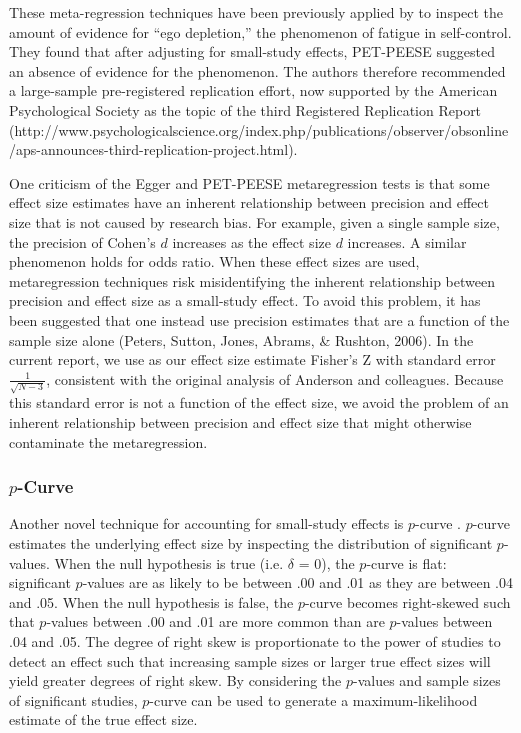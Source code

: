 \documentclass[man]{apa6}
\begin{document}
These meta-regression techniques have been previously applied by \citet{Carter:McCullough:2014} to inspect the amount of evidence for ``ego depletion,'' the phenomenon of fatigue in self-control. They found that after adjusting for small-study effects, PET-PEESE suggested an absence of evidence for the phenomenon. The authors therefore recommended a large-sample pre-registered replication effort, now supported by the American Psychological Society as the topic of the third Registered Replication Report (http://www.psychologicalscience.org/index.php/publications/observer/obsonline/aps-announces-third-replication-project.html).

One criticism of the Egger and PET-PEESE metaregression tests is that some effect size estimates have an inherent relationship between precision and effect size that is not caused by research bias. For example, given a single sample size, the precision of Cohen's $d$ increases as the effect size $d$ increases. A similar phenomenon holds for odds ratio. When these effect sizes are used, metaregression techniques risk misidentifying the inherent relationship between precision and effect size as a small-study effect. To avoid this problem, it has been suggested that one instead use precision estimates that are a function of the sample size alone (Peters, Sutton, Jones, Abrams, \& Rushton, 2006). In the current report, we use as our effect size estimate Fisher's Z with standard error $\frac{1}{\sqrt{N-3}}$, consistent with the original analysis of Anderson and colleagues. Because this standard error is not a function of the effect size, we avoid the problem of an inherent relationship between precision and effect size that might otherwise contaminate the metaregression.

\subsubsection{$p$-Curve}
Another novel technique for accounting for small-study effects is $p$-curve \citep{Simonsohn:etal:2014,Simonsohn:etal:2014b}. $p$-curve estimates the underlying effect size by inspecting the distribution of significant $p$-values. 
When the null hypothesis is true (i.e. $\delta$ = 0), the $p$-curve is flat: significant $p$-values are as likely to be between .00 and .01 as they are between .04 and .05. When the null hypothesis is false, the $p$-curve becomes right-skewed such that $p$-values between .00 and .01 are more common than are $p$-values between .04 and .05. The degree of right skew is proportionate to the power of studies to detect an effect such that increasing sample sizes or larger true effect sizes will yield greater degrees of right skew. By considering the $p$-values and sample sizes of significant studies, $p$-curve can be used to generate a maximum-likelihood estimate of the true effect size.
\end{document}
